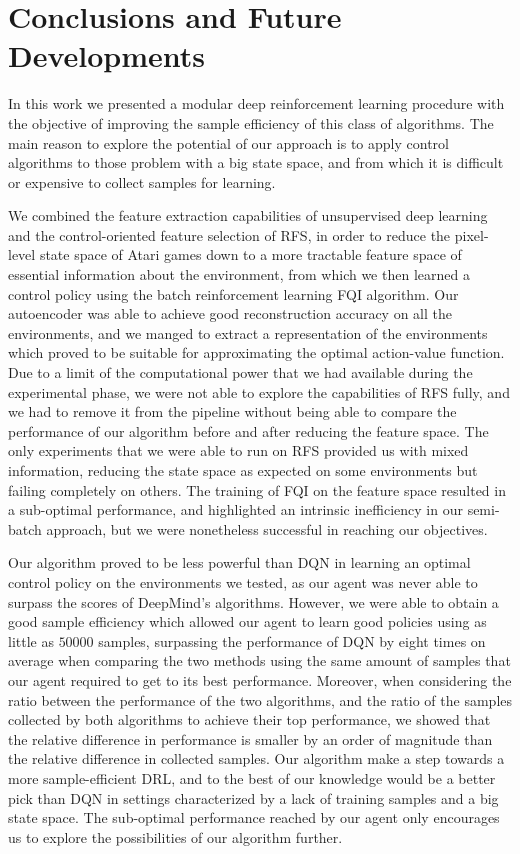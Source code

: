 \chapter{Conclusions and Future Developments}
\label{chapter7_conclusions}
\thispagestyle{empty}

\vspace{0.5cm}

In this work we presented a modular deep reinforcement learning procedure 
with the objective of improving the sample efficiency of this class of 
algorithms.
The main reason to explore the potential of our approach is to apply control
algorithms to those problem with a big state space, and from which it is 
difficult or expensive to collect samples for learning. 

We combined the feature extraction capabilities of unsupervised deep learning 
and the control-oriented feature selection of RFS, in order to reduce the 
pixel-level state space of Atari games down to a more tractable feature space of 
essential information about the environment, from which we then learned a 
control policy using the batch reinforcement learning FQI algorithm.
Our autoencoder was able to achieve good reconstruction accuracy on all the
environments, and we manged to extract a representation of the environments 
which proved to be suitable for approximating the optimal action-value function.
Due to a limit of the computational power that we had available during the 
experimental phase, we were not able to explore the capabilities of RFS fully, 
and we had to remove it from the pipeline without being able to compare the 
performance of our algorithm before and after reducing the feature space. 
The only experiments that we were able to run on RFS provided us with mixed
information, reducing the state space as expected on some environments but 
failing completely on others. 
The training of FQI on the feature space resulted in a sub-optimal
performance, and highlighted an intrinsic inefficiency in our semi-batch 
approach, but we were nonetheless successful in reaching our objectives.

Our algorithm proved to be less powerful than DQN in learning an optimal control
policy on the environments we tested, as our agent was never able to surpass the
scores of DeepMind's algorithms.
However, we were able to obtain a good sample efficiency which allowed our agent 
to learn good policies using as little as $50000$ samples, surpassing the 
performance of DQN by eight times on average when comparing the two methods 
using the same amount of samples that our agent required to get to its best 
performance.
Moreover, when considering the ratio between the performance of the two 
algorithms, and the ratio of the samples collected by both algorithms to 
achieve their top performance, we showed that the relative difference in 
performance is smaller by an order of magnitude than the relative difference in 
collected samples. 
Our algorithm make a step towards a more sample-efficient DRL, and to the
best of our knowledge would be a better pick than DQN in settings characterized 
by a lack of training samples and a big state space. The sub-optimal performance
reached by our agent only encourages us to explore the possibilities of our
algorithm further.

